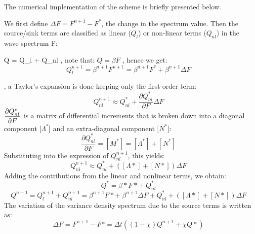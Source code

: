  The numerical implementation of the scheme is briefly presented below.

 We first define $\Delta F = F^{n+1} - F^*$, the change in the spectrum value. Then the source/sink terms are classified as linear ($Q_{l}$) or non-linear terms ($Q_{nl}$) in the wave spectrum F:

\bequ \label {GrindEQ__6_11_}
Q = Q_{l} + Q_{nl} 
\eequ
 , note that: $Q = \beta F $ , hence we get:
\begin{equation} \label{GrindEQ__6_12_}
Q_{l}^{n+1} =\beta ^{n+1} F^{n+1} =\beta ^{n+1} F^*+\beta ^{n+1} \Delta F
\end{equation}

 , a Taylor's expansion is done keeping only the first-order term:
\begin{equation} \label{GrindEQ__6_13_}
Q_{nl}^{n+1} \approx Q_{nl}^{*} +\frac{\partial Q_{nl}^{*} }{\partial F} \Delta F
\end{equation}
$\displaystyle \frac{\partial Q_{nl}^{*} }{\partial F} $ is a matrix of differential increments that is broken down into a diagonal component [$\Lambda^*$] and an extra-diagonal component [$N^*$]:
\begin{equation} \label{GrindEQ__6_14_}
\frac{\partial Q_{nl}^{*} }{\partial F} =\left[M^{*} \right]=\left[\Lambda ^{*} \right]+\left[N^{*} \right]
\end{equation}
Substituting into the expression of $Q_{nl}^{n+1} $, this yields:
\begin{equation} \label{GrindEQ__6_15_}
Q_{nl}^{n+1} \approx Q_{nl}^{*} +\left(\left[\Lambda *\right]+\left[N*\right]\right)\Delta F
\end{equation}
Adding the contributions from the linear and nonlinear terms, we obtain:
\begin{equation} \label{GrindEQ__6_16_}
Q_{}^{*} =\beta *F*+\; Q_{nl}^{*}
\end{equation}
\begin{equation} \label{GrindEQ__6_17_}
Q_{}^{n+1} =Q_{l}^{n+1} +Q_{nl}^{n+1} =\beta ^{n+1} F*+\; \beta ^{n+1} \Delta F+Q_{nl}^{*} +\left(\left[\Lambda *\right]+\left[N*\right]\right)\Delta F
\end{equation}
The variation of the variance density spectrum due to the source terms is written as:
\begin{equation} \label{GrindEQ__6_18_}
\Delta F=F^{n+1} -F*=\Delta t\left((1-\chi )Q^{n+1} +\chi Q*\right)
\end{equation}
